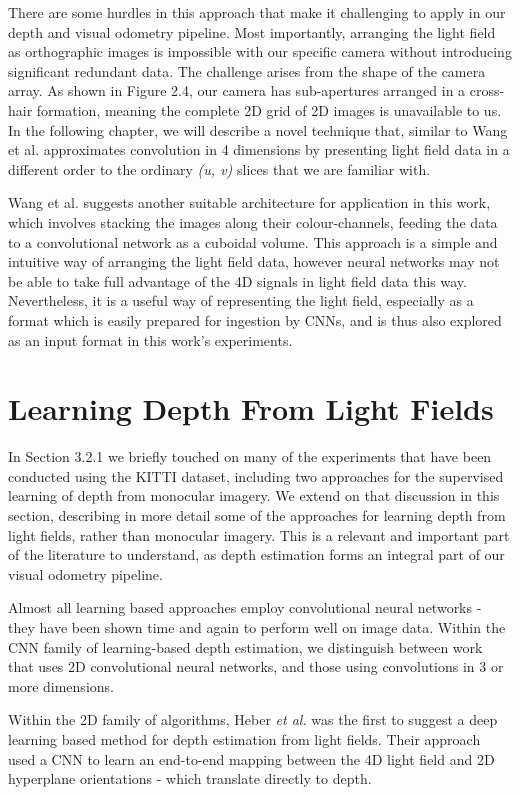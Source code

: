 There are some hurdles in this approach that make it challenging to apply in our depth and visual odometry pipeline. Most importantly, arranging the light field as orthographic images is impossible with our specific camera without introducing significant redundant data. The challenge arises from the shape of the camera array. As shown in Figure 2.4, our camera has sub-apertures arranged in a cross-hair formation, meaning the complete 2D grid of 2D images is unavailable to us. In the following chapter, we will describe a novel technique that, similar to Wang et al. approximates convolution in 4 dimensions by presenting light field data in a different order to the ordinary \textit{(u, v)} slices that we are familiar with.

Wang et al. suggests another suitable architecture for application in this work, which involves stacking the images along their colour-channels, feeding the data to a convolutional network as a cuboidal volume. This approach is a simple and intuitive way of arranging the light field data, however neural networks may not be able to take full advantage of the 4D signals in light field data this way. Nevertheless, it is a useful way of representing the light field, especially as a format which is easily prepared for ingestion by CNNs, and is thus also explored as an input format in this work's experiments.


\section{Learning Depth From Light Fields}

In Section 3.2.1 we briefly touched on many of the experiments that have been conducted using the KITTI dataset, including two approaches for the supervised learning of depth from monocular imagery. We extend on that discussion in this section, describing in more detail some of the approaches for learning depth from light fields, rather than monocular imagery. This is a relevant and important part of the literature to understand, as depth estimation forms an integral part of our visual odometry pipeline. 

Almost all learning based approaches employ convolutional neural networks - they have been shown time and again to perform well on image data. Within the CNN family of learning-based depth estimation, we distinguish between work that uses 2D convolutional neural networks, and those using convolutions in 3 or more dimensions. 

Within the 2D family of algorithms, Heber \textit{et al.} \cite{heber2017shape} was the first to suggest a deep learning based method for depth estimation from light fields. Their approach used a CNN to learn an end-to-end mapping between the 4D light field and 2D hyperplane orientations - which translate directly to depth. 

